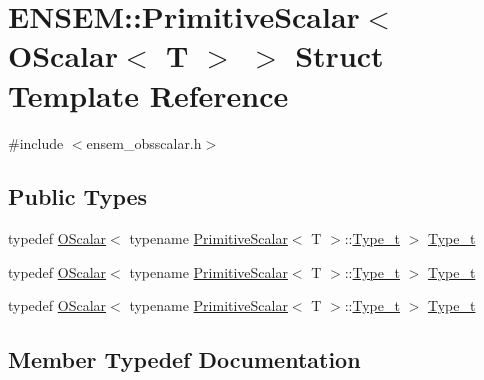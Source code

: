 \hypertarget{structENSEM_1_1PrimitiveScalar_3_01OScalar_3_01T_01_4_01_4}{}\section{E\+N\+S\+EM\+:\+:Primitive\+Scalar$<$ O\+Scalar$<$ T $>$ $>$ Struct Template Reference}
\label{structENSEM_1_1PrimitiveScalar_3_01OScalar_3_01T_01_4_01_4}


{\ttfamily \#include $<$ensem\+\_\+obsscalar.\+h$>$}

\subsection*{Public Types}
\begin{DoxyCompactItemize}
\item 
typedef \mbox{\hyperlink{classENSEM_1_1OScalar}{O\+Scalar}}$<$ typename \mbox{\hyperlink{structENSEM_1_1PrimitiveScalar}{Primitive\+Scalar}}$<$ T $>$\+::\mbox{\hyperlink{structENSEM_1_1PrimitiveScalar_3_01OScalar_3_01T_01_4_01_4_a04f9a62c0498189e4c514dce6a7baa36}{Type\+\_\+t}} $>$ \mbox{\hyperlink{structENSEM_1_1PrimitiveScalar_3_01OScalar_3_01T_01_4_01_4_a04f9a62c0498189e4c514dce6a7baa36}{Type\+\_\+t}}
\item 
typedef \mbox{\hyperlink{classENSEM_1_1OScalar}{O\+Scalar}}$<$ typename \mbox{\hyperlink{structENSEM_1_1PrimitiveScalar}{Primitive\+Scalar}}$<$ T $>$\+::\mbox{\hyperlink{structENSEM_1_1PrimitiveScalar_3_01OScalar_3_01T_01_4_01_4_a04f9a62c0498189e4c514dce6a7baa36}{Type\+\_\+t}} $>$ \mbox{\hyperlink{structENSEM_1_1PrimitiveScalar_3_01OScalar_3_01T_01_4_01_4_a04f9a62c0498189e4c514dce6a7baa36}{Type\+\_\+t}}
\item 
typedef \mbox{\hyperlink{classENSEM_1_1OScalar}{O\+Scalar}}$<$ typename \mbox{\hyperlink{structENSEM_1_1PrimitiveScalar}{Primitive\+Scalar}}$<$ T $>$\+::\mbox{\hyperlink{structENSEM_1_1PrimitiveScalar_3_01OScalar_3_01T_01_4_01_4_a04f9a62c0498189e4c514dce6a7baa36}{Type\+\_\+t}} $>$ \mbox{\hyperlink{structENSEM_1_1PrimitiveScalar_3_01OScalar_3_01T_01_4_01_4_a04f9a62c0498189e4c514dce6a7baa36}{Type\+\_\+t}}
\end{DoxyCompactItemize}


\subsection{Member Typedef Documentation}
\mbox{\label{structENSEM_1_1PrimitiveScalar_3_01OScalar_3_01T_01_4_01_4_a04f9a62c0498189e4c514dce6a7baa36}} 
